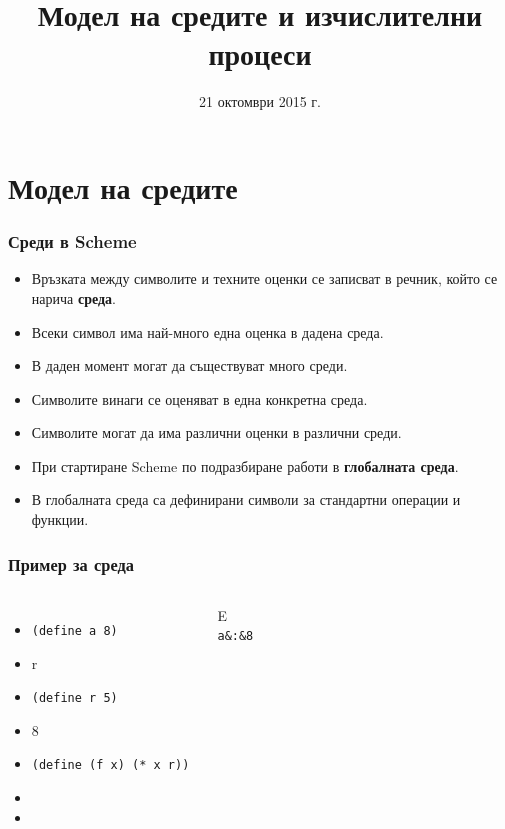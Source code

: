\documentclass{beamer}
\title[Среди и процеси]{Модел на средите и изчислителни процеси}
\date{21 октомври 2015 г.}
\begin{document}
\begin{frame}
  \titlepage
\end{frame}

\section{Модел на средите}

\begin{frame}
  \frametitle{Среди в Scheme}

  \begin{itemize}[<+->]
  \item Връзката между символите и техните оценки се записват в речник, който се нарича \textbf{среда}.
  \item Всеки символ има най-много една оценка в дадена среда.
  \item В даден момент могат да съществуват много среди.
  \item Символите винаги се оценяват в една конкретна среда.
  \item \alert{Символите могат да има различни оценки в различни среди.}
  \item При стартиране Scheme по подразбиране работи в \textbf{глобалната среда}.
  \item В глобалната среда са дефинирани символи за стандартни операции и функции.
  \end{itemize}
\end{frame}

\begin{frame}
  \frametitle{Пример за среда}

  \begin{columns}[t,onlytextwidth]
    {}

    \begin{itemize}[<+->]
    \item \tt{(define a 8)}
    \item \evalstoerr r
    \item \tt{(define r 5)}
    \item {}8
    \item \tt{(define (f x) (* x r))}
    \item {}
    \item {}
    \end{itemize}

    {}

    \begin{envir}{E}
      \\\firstinenv \tt a&:&8
    \end{envir}
  \end{columns}
\end{frame}
\end{document}
